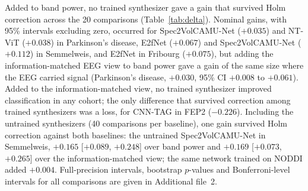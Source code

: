 Added to band power, no trained synthesizer gave a gain that survived Holm correction across the 20 comparisons (Table~\ref{tab:delta}). Nominal gains, with 95\% intervals excluding zero, occurred for Spec2VolCAMU-Net ($+0.035$) and NT-ViT ($+0.038$) in Parkinson's disease, E2fNet ($+0.067$) and Spec2VolCAMU-Net ($+0.112$) in Semmelweis, and E2fNet in Fribourg ($+0.075$), but adding the information-matched EEG view to band power gave a gain of the same size where the EEG carried signal (Parkinson's disease, $+0.030$, 95\% CI $+0.008$ to $+0.061$). Added to the information-matched view, no trained synthesizer improved classification in any cohort; the only difference that survived correction among trained synthesizers was a loss, for CNN-TAG in FEP2 ($-0.226$). Including the untrained synthesizers (40 comparisons per baseline), one gain survived Holm correction against both baselines: the untrained Spec2VolCAMU-Net in Semmelweis, $+0.165$ [$+0.089$, $+0.248$] over band power and $+0.169$ [$+0.073$, $+0.265$] over the information-matched view; the same network trained on NODDI added $+0.004$. Full-precision intervals, bootstrap $p$-values and Bonferroni-level intervals for all comparisons are given in Additional file~2.

